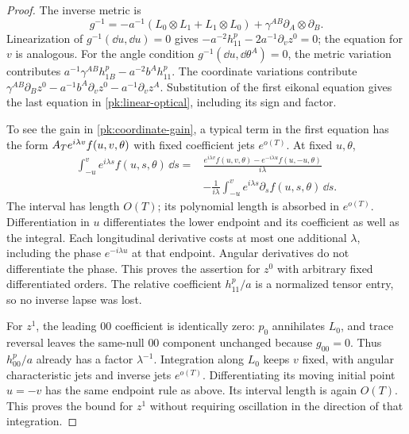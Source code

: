 \begin{proof}
The inverse metric is
\[
 g^{-1}=-a^{-1}(L_0\otimes L_1+L_1\otimes L_0)
                        +\gamma^{AB}\partial_A\otimes\partial_B.
\]
Linearization of $g^{-1}(\dd u,\dd u)=0$ gives
$-a^{-2}h^p_{11}-2a^{-1}\partial_vz^0=0$; the equation for $v$
is analogous. For the angle condition
$g^{-1}(\dd u,\dd\theta^A)=0$, the metric variation contributes
$a^{-1}\gamma^{AB}h^p_{1B}-a^{-2}b^Ah^p_{11}$.
The coordinate variations contribute
$\gamma^{AB}\partial_Bz^0-a^{-1}b^A\partial_vz^0
-a^{-1}\partial_vz^A$.
Substitution of the first eikonal equation gives the last equation
in \eqref{pk:linear-optical}, including its sign and factor.

To see the gain in \eqref{pk:coordinate-gain}, a typical term in
the first equation has the form
$A_T e^{i\lambda v}f(u,v,\theta)$ with fixed coefficient jets
$e^{o(T)}$. At fixed $u,\theta$,
\begin{equation}\label{pk:oscillatory-integral}
 \begin{split}
 \int_{-u}^{v}e^{i\lambda s}f(u,s,\theta)\,\dd s
 ={}&\frac{e^{i\lambda v}f(u,v,\theta)
          -e^{-i\lambda u}f(u,-u,\theta)}{i\lambda}\\
 &-\frac1{i\lambda}
           \int_{-u}^{v}e^{i\lambda s}\partial_sf(u,s,\theta)\,\dd s.
 \end{split}
\end{equation}
The interval has length $O(T)$; its polynomial length is absorbed
in $e^{o(T)}$. Differentiation in $u$ differentiates the lower
endpoint and its coefficient as well as the integral. Each
longitudinal derivative costs at most one additional $\lambda$,
including the phase $e^{-i\lambda u}$ at that endpoint. Angular
derivatives do not differentiate the phase. This proves the
assertion for $z^0$ with arbitrary fixed differentiated orders.
The relative coefficient $h^p_{11}/a$ is a normalized tensor
entry, so no inverse lapse was lost.

For $z^1$, the leading $00$ coefficient is identically zero:
$p_0$ annihilates $L_0$, and trace reversal leaves the same-null
$00$ component unchanged because $g_{00}=0$. Thus $h^p_{00}/a$ already has a factor
$\lambda^{-1}$. Integration along $L_0$ keeps $v$ fixed, with
angular characteristic jets and inverse jets $e^{o(T)}$.
Differentiating its moving initial point $u=-v$ has the same
endpoint rule as above. Its interval length is again $O(T)$.
This proves the bound for $z^1$ without requiring oscillation in
the direction of that integration.


\end{proof}
